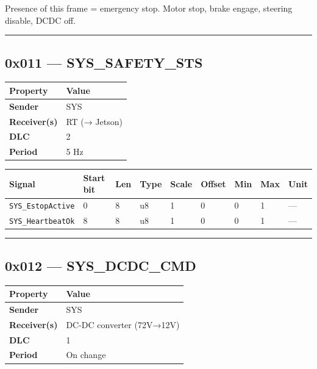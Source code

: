 \documentclass[12pt,a4paper,oneside]{report}
\begin{document}
Presence of this frame = emergency stop. Motor stop, brake engage, steering
disable, DCDC off.

\begin{center}\rule{0.5\linewidth}{0.5pt}\end{center}

\subsection{0x011 --- SYS\_SAFETY\_STS}\label{x011-sys_safety_sts}

\begin{longtable}[]{@{}ll@{}}
\toprule\noalign{}
Property & Value \\
\midrule\noalign{}
\endhead
\bottomrule\noalign{}
\endlastfoot
\textbf{Sender} & SYS \\
\textbf{Receiver(s)} & RT (→ Jetson) \\
\textbf{DLC} & 2 \\
\textbf{Period} & 5 Hz \\
\end{longtable}

\begin{longtable}[]{@{}lllllllll@{}}
\toprule\noalign{}
Signal & Start bit & Len & Type & Scale & Offset & Min & Max & Unit \\
\midrule\noalign{}
\endhead
\bottomrule\noalign{}
\endlastfoot
\texttt{SYS\_EstopActive} & 0 & 8 & u8 & 1 & 0 & 0 & 1 & --- \\
\texttt{SYS\_HeartbeatOk} & 8 & 8 & u8 & 1 & 0 & 0 & 1 & --- \\
\end{longtable}

\begin{center}\rule{0.5\linewidth}{0.5pt}\end{center}

\subsection{0x012 --- SYS\_DCDC\_CMD}\label{x012-sys_dcdc_cmd}

\begin{longtable}[]{@{}ll@{}}
\toprule\noalign{}
Property & Value \\
\midrule\noalign{}
\endhead
\bottomrule\noalign{}
\endlastfoot
\textbf{Sender} & SYS \\
\textbf{Receiver(s)} & DC-DC converter (72V→12V) \\
\textbf{DLC} & 1 \\
\textbf{Period} & On change \\
\end{longtable}
\end{document}
